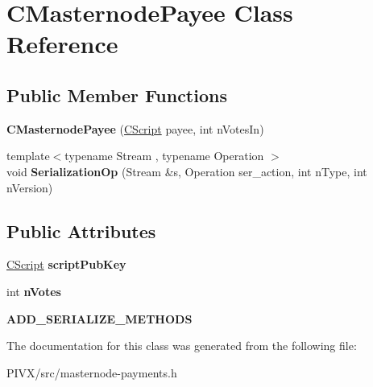 \hypertarget{class_c_masternode_payee}{}\section{C\+Masternode\+Payee Class Reference}
\label{class_c_masternode_payee}
\subsection*{Public Member Functions}
\begin{DoxyCompactItemize}
\item 
\mbox{\label{class_c_masternode_payee_a39fb9426ef5a30145589094998efe7e9}} 
{\bfseries C\+Masternode\+Payee} (\mbox{\hyperlink{class_c_script}{C\+Script}} payee, int n\+Votes\+In)
\item 
\mbox{\label{class_c_masternode_payee_a43f62a2409a02ccb16b4b43b00442888}} 
{\footnotesize template$<$typename Stream , typename Operation $>$ }\\void {\bfseries Serialization\+Op} (Stream \&s, Operation ser\+\_\+action, int n\+Type, int n\+Version)
\end{DoxyCompactItemize}
\subsection*{Public Attributes}
\begin{DoxyCompactItemize}
\item 
\mbox{\label{class_c_masternode_payee_ab7f8d7f7108b556c92edd00ddd190e63}} 
\mbox{\hyperlink{class_c_script}{C\+Script}} {\bfseries script\+Pub\+Key}
\item 
\mbox{\label{class_c_masternode_payee_a85f2282517fea195b3c8e7a65f816d92}} 
int {\bfseries n\+Votes}
\item 
\mbox{\label{class_c_masternode_payee_a601ce07af776d21f02a76878c6de16e8}} 
{\bfseries A\+D\+D\+\_\+\+S\+E\+R\+I\+A\+L\+I\+Z\+E\+\_\+\+M\+E\+T\+H\+O\+DS}
\end{DoxyCompactItemize}


The documentation for this class was generated from the following file\+:\begin{DoxyCompactItemize}
\item 
P\+I\+V\+X/src/masternode-\/payments.\+h\end{DoxyCompactItemize}
